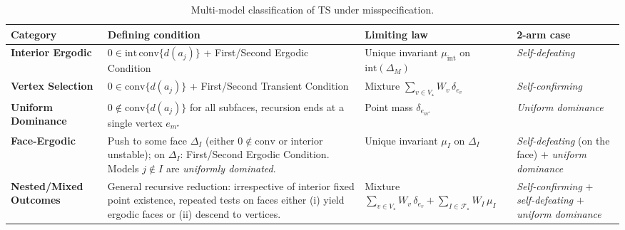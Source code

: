\documentclass[12pt]{article}
\begin{document}
\begin{table}[H]
        \centering
        \renewcommand{\arraystretch}{1.2}
        \footnotesize
        \begin{tabular}{|p{2.4cm}|p{5.8cm}|p{3.5cm}|p{2.6cm}|}
        \hline
        \textbf{Category} 
        & \textbf{Defining condition} 
        & \textbf{Limiting law} 
        & \textbf{2-arm case} \\
        \hline
        \textbf{Interior \newline Ergodic} 
        & {\scriptsize $0\in\mathrm{int}\,\mathrm{conv}\{d(a_j)\}$} + \newline First/Second Ergodic Condition
        & {\scriptsize Unique invariant $\mu_{\mathrm{int}}$ on $\mathrm{int}(\Delta_M)$} 
        & \emph{Self-defeating} \\
        \hline
        \textbf{Vertex \newline Selection} 
        & {\scriptsize $0\in \mathrm{conv}\{d(a_j)\}$} + \newline First/Second Transient Condition 
        & {\scriptsize Mixture $\sum_{v\in V_\star} W_v\,\delta_{e_v}$} 
        & \emph{Self-confirming} \\
        \hline
        \textbf{Uniform \newline Dominance} 
        & {\scriptsize $0\notin \mathrm{conv}\{d(a_j)\}$} for all subfaces, recursion ends at a single vertex {\scriptsize $e_{m^\star}$} 
        & {\scriptsize Point mass $\delta_{e_{m^\star}}$} 
        & \emph{Uniform \newline dominance} \\
        \hline
        \textbf{Face-Ergodic} 
        & Push to some face {\scriptsize $\Delta_I$} (either {\scriptsize $0\notin\mathrm{conv}$} or interior unstable); on {\scriptsize $\Delta_I$}: First/Second Ergodic Condition. Models {\scriptsize $j\notin I$} are \emph{uniformly dominated}. 
        & {\scriptsize Unique invariant $\mu_I$ on $\Delta_I$} 
        & \emph{Self-defeating} (on the face) $+$ \newline \emph{uniform \newline dominance} \\
        \hline
        \textbf{Nested/Mixed \newline Outcomes} 
        & General recursive reduction: irrespective of interior fixed point existence, repeated tests on faces either (i) yield ergodic faces or (ii) descend to vertices. 
        & {\scriptsize Mixture $\displaystyle \sum_{v\in V_\star} W_v\,\delta_{e_v}+\sum_{I\in\mathcal{F}_\star} W_I\,\mu_I$} 
        & \emph{Self-confirming} $+$ \newline \emph{self-defeating} $+$ \newline \emph{uniform \newline dominance} \\
        \hline
        \end{tabular}
        \caption{Multi-model classification of TS under misspecification.}
        \label{tab:multi_model_classification}
\end{table}
\end{document}
